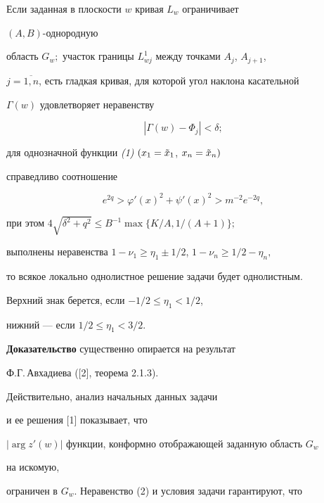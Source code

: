 \begin{thm} Если заданная в плоскости $w$ кривая $L_w$ ограничивает


$(A,B)$-однородную


об\-ласть $G_w;$ участок границы $L_{wj}^1$ между точками $A_j$, $A_{j+1}$,


$j=\overline{1,n}$, есть гладкая кривая, для которой угол наклона касательной


$\Gamma(w)$ удовлетворяет неравенству


\begin{equation}


|\Gamma(w)-\Phi_j|<\delta;


\end{equation}


для однозначной функции {\em (1)} $(x_1=\Tilde x_1$, $x_n=\Tilde x_n)$


справедливо соотношение


\begin{equation}


e^{2q} > \varphi'(x)^{2}+\psi'(x)^{2} > m^{-2}e^{-2q},


\end{equation}


при этом $4\sqrt{\delta^{2}+q^{2}}\le B^{-1}\max\{{K/A},{1/(A+1)}\};$


выполнены неравенства $1-\nu_1 \ge \eta_1 \pm 1/2$, $1-\nu_n \ge 1/2-\eta_n,$


то всякое локально однолистное решение задачи будет однолистным.





Верхний знак берется, если $-1/2\le\eta_1<1/2$,


нижний --- если $1/2\le\eta_1<3/2 $.


\end{thm}





{\bf Доказательство} существенно опирается на результат


Ф.Г.\,Авхадиева ([2], теорема 2.1.3).


Действительно, анализ начальных данных задачи


и ее решения [1] показывает, что


$|\arg z'(w)|$ функции, конформно отображающей заданную область $G_w$


на искомую,


ограничен в $G_w$. Неравенство (2) и условия задачи гарантируют, что 


